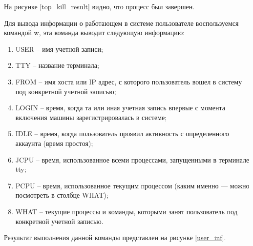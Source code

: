 
На рисунке \ref{top_kill_result} видно, что процесс был завершен.

Для вывода информации о работающем в системе пользователе воспользуемся командой w, эта команда выводит следующую информацию:
\begin{enumerate}
    \item USER – имя учетной записи;
    \item TTY – название терминала;
    \item FROM – имя хоста или IP адрес, с которого пользователь вошел в систему под конкретной учетной записью;
    \item LOGIN – время, когда та или иная учетная запись впервые с момента включения машины зарегистрировалась в системе;
    \item IDLE – время, когда пользователь проявил активность с определенного аккаунта (время простоя);
    \item JCPU – время, использованное всеми процессами, запущенными в терминале tty;
    \item PCPU – время, использованное текущим процессом (каким именно — можно посмотреть в столбце WHAT);
    \item WHAT – текущие процессы и команды, которыми занят пользователь под конкретной учетной записью.
\end{enumerate}

Результат выполнения данной команды представлен на рисунке \ref{user_inf}.



